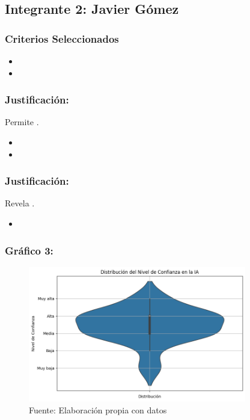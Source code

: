 \documentclass[12pt, a4paper]{article}
\begin{document}
\newpage
\subsection*{Integrante 2: Javier Gómez}

\subsubsection*{Criterios Seleccionados}
\begin{itemize}
    \item 
    \item 
\end{itemize}

\subsubsection*{Justificación: }
Permite .

\begin{itemize}
    \item 
    \item 
\end{itemize}

\subsubsection*{Justificación: }
Revela .
\begin{itemize}
    \item 
\end{itemize}

\subsubsection*{Gráfico 3: }
\begin{figure}[H]
    \centering
    \includegraphics[width=0.85\textwidth]{Graficos/beeswarn.png}
    \caption[3]{Fuente: Elaboración propia con datos}
\end{figure}
\end{document}
